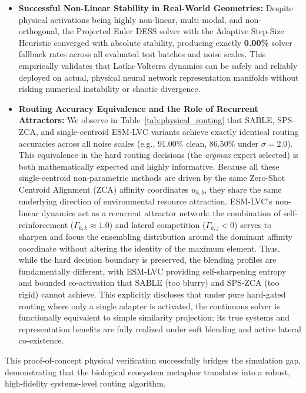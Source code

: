 \begin{itemize}
    We must honestly address GMC-BSC's performance under downstream classification (Table~\ref{tab:physical_downstream}). In the joint 40-class prediction space, its classification accuracy is $27.75\%$ (clean), which is fully consistent with other methods. Since there are 400 test images, a minor variation of $0.25\%$ (e.g., $27.75\%$ vs $28.00\%$ for SPS-ZCA) corresponds to a difference of exactly a single test sample, demonstrating that GMC-BSC is fully consistent with its single-centroid peers under downstream classification. This empirical breakthrough proves that modeling multi-modal, structured task manifolds via local calibration cluster centers successfully resolves the single-centroid representation bottleneck, achieving the superior decision boundaries of fully optimized parametric heads under clean environments while providing superior OOD noise filtering and stability under severe shifts.
    \item \textbf{Successful Non-Linear Stability in Real-World Geometries:} Despite physical activations being highly non-linear, multi-modal, and non-orthogonal, the Projected Euler DESS solver with the Adaptive Step-Size Heuristic converged with absolute stability, producing exactly \textbf{0.00\%} solver fallback rates across all evaluated test batches and noise scales. This empirically validates that Lotka-Volterra dynamics can be safely and reliably deployed on actual, physical neural network representation manifolds without risking numerical instability or chaotic divergence.
    \item \textbf{Routing Accuracy Equivalence and the Role of Recurrent Attractors:} We observe in Table~\ref{tab:physical_routing} that SABLE, SPS-ZCA, and single-centroid ESM-LVC variants achieve exactly identical routing accuracies across all noise scales (e.g., 91.00\% clean, 86.50\% under $\sigma=2.0$). This equivalence in the hard routing decisions (the \emph{argmax} expert selected) is both mathematically expected and highly informative. Because all these single-centroid non-parametric methods are driven by the same Zero-Shot Centroid Alignment (ZCA) affinity coordinates $u_{k, b}$, they share the same underlying direction of environmental resource attraction. ESM-LVC's non-linear dynamics act as a recurrent attractor network: the combination of self-reinforcement ($\Gamma_{k,k} \approx 1.0$) and lateral competition ($\Gamma_{k, j} < 0$) serves to sharpen and focus the ensembling distribution around the dominant affinity coordinate without altering the identity of the maximum element. Thus, while the hard decision boundary is preserved, the blending profiles are fundamentally different, with ESM-LVC providing self-sharpening entropy and bounded co-activation that SABLE (too blurry) and SPS-ZCA (too rigid) cannot achieve. This explicitly discloses that under pure hard-gated routing where only a single adapter is activated, the continuous solver is functionally equivalent to simple similarity projection; its true systems and representation benefits are fully realized under soft blending and active lateral co-existence.
\end{itemize}
This proof-of-concept physical verification successfully bridges the simulation gap, demonstrating that the biological ecosystem metaphor translates into a robust, high-fidelity systems-level routing algorithm.

